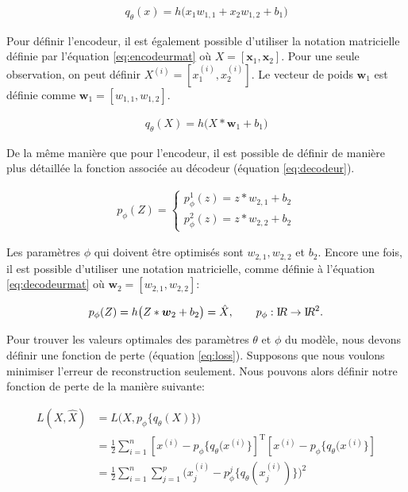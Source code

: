 \begin{gather}  \label{eq:encodeur}
q_{\theta}(x)=h\big(x_1w_{1,1} + x_2 w_{1,2} + b_1\big)
\end{gather}

Pour définir l'encodeur, il est également possible d'utiliser la notation matricielle définie par l'équation \ref{eq:encodeurmat} où $X = [\boldsymbol x_1, \boldsymbol x_2]$. Pour une seule observation, on peut définir $X^{(i)} = [x_{1}^{(i)}, x_{2}^{(i)}]$. Le vecteur de poids $\boldsymbol w_1$ est définie comme $\boldsymbol w_1 = [w_{1,1}, w_{1,2}]$.

\begin{gather}  \label{eq:encodeurmat}
q_{\theta}(X)=h\big(X*\boldsymbol w_1 + b_1\big)
\end{gather}

De la même manière que pour l'encodeur, il est possible de définir de manière plus détaillée la fonction associée au décodeur (équation \ref{eq:decodeur}).

\begin{gather}  \label{eq:decodeur}
p_{\phi}(Z)=
\begin{cases}
p_{\phi}^1(z) = z*w_{2,1}+b_2 \\
p_{\phi}^2(z) = z*w_{2,2}+b_2
\end{cases}
\end{gather}

Les paramètres $\phi$ qui doivent être optimisés sont $w_{2,1}, w_{2,2}$ et $b_2$. Encore une fois, il est possible d'utiliser une notation matricielle, comme définie à l'équation \ref{eq:decodeurmat} où $\boldsymbol w_2 = [w_{2,1}, w_{2,2}]$:

\begin{gather} \label{eq:decodeurmat}
p_{\phi}(Z)=h\big(Z*\boldsymbol w_2 + b_2\big)=\hat{X}, \qquad
p_{\phi}: \textrm I\!R \rightarrow \textrm I\!R^2.
\end{gather}

Pour trouver les valeurs optimales des paramètres $\theta$ et $\phi$ du modèle, nous devons définir une fonction de perte (équation \ref{eq:loss}). Supposons que nous voulons minimiser l'erreur de reconstruction seulement. Nous pouvons alors définir notre fonction de perte de la manière suivante:

\begin{equation} \label{perte1}
\begin{split}
L(X,\hat{X}) & = L\big(X, p_\phi\{q_\theta(X)\}\big) \\
& = \frac{1}{2} \sum_{i=1}^{n} [x^{(i)}-p_\phi\{q_\theta(x^{(i)}\}]^{\text{T}}[x^{(i)}-p_\phi\{q_\theta(x^{(i)}\}] \\
& = \frac{1}{2} \sum_{i=1}^{n} \sum_{j=1}^{p} \big(x_{j}^{(i)}-p^j_\phi\{q_\theta(x_{j}^{(i)})\}\big)^2
\end{split}
\end{equation}

